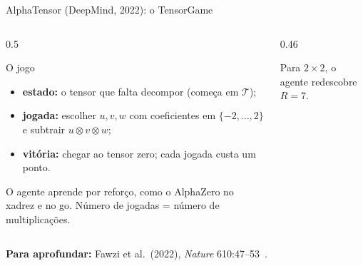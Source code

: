 \documentclass[aspectratio=169,xcolor=table]{beamer}
\newcommand{\fonte}[1]{%
  \vfill
  {\tiny\color{gray!55!black}\textbf{Para aprofundar:} #1\par}%
}
\begin{document}
\begin{frame}{AlphaTensor (DeepMind, 2022): o TensorGame}
  \begin{columns}[c]
    \begin{column}{0.5\textwidth}
      \begin{block}{O jogo}
        \scriptsize
        \begin{itemize}\scriptsize
          \item \textbf{estado:} o tensor que falta decompor (começa em $\mathcal T$);
          \item \textbf{jogada:} escolher $u,v,w$ com coeficientes em
                $\{-2,\dots,2\}$ e subtrair $u\otimes v\otimes w$;
          \item \textbf{vitória:} chegar ao tensor zero; cada jogada custa um ponto.
        \end{itemize}
      \end{block}
      \scriptsize O agente aprende por reforço, como o AlphaZero no xadrez e no go.
      Número de jogadas = número de multiplicações.
    \end{column}
    \begin{column}{0.46\textwidth}
      \centering
      \medskip

      \scriptsize Para $2\times 2$, o agente redescobre $R=7$.
    \end{column}
  \end{columns}
  \fonte{Fawzi et al.\ (2022), \emph{Nature} 610:47--53~\cite{fawzi2022discovering}.}
\end{frame}
\end{document}
